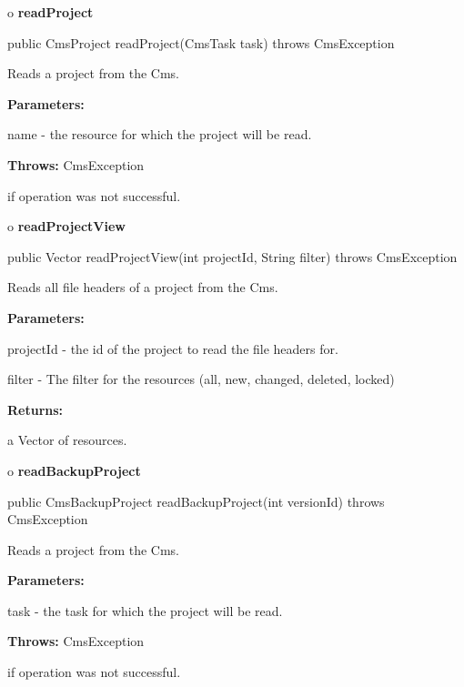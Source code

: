 o {\bf readProject} 

\begin{PRE}
 public CmsProject readProject(CmsTask task) throws CmsException
\end{PRE}

\begin{description}
\htmlDD Reads a project from the Cms. 

\begin{description}
\item {\bf Parameters:}  

name - the resource for which the project will be read.  
\item {\bf Throws:} CmsException  

if operation was not successful.  
\end{description}

\end{description}

o {\bf readProjectView} 

\begin{PRE}
 public Vector readProjectView(int projectId,
                               String filter) throws CmsException
\end{PRE}

\begin{description}
\htmlDD Reads all file headers of a project from the Cms. 

\begin{description}
\item {\bf Parameters:}  

projectId - the id of the project to read the file headers for.  

filter - The filter for the resources (all, new, changed, deleted, locked)  
\item {\bf Returns:}  

a Vector of resources.  
\end{description}

\end{description}

o {\bf readBackupProject} 

\begin{PRE}
 public CmsBackupProject readBackupProject(int versionId) throws CmsException
\end{PRE}

\begin{description}
\htmlDD Reads a project from the Cms. 

\begin{description}
\item {\bf Parameters:}  

task - the task for which the project will be read.  
\item {\bf Throws:} CmsException  

if operation was not successful.  
\end{description}

\end{description}

